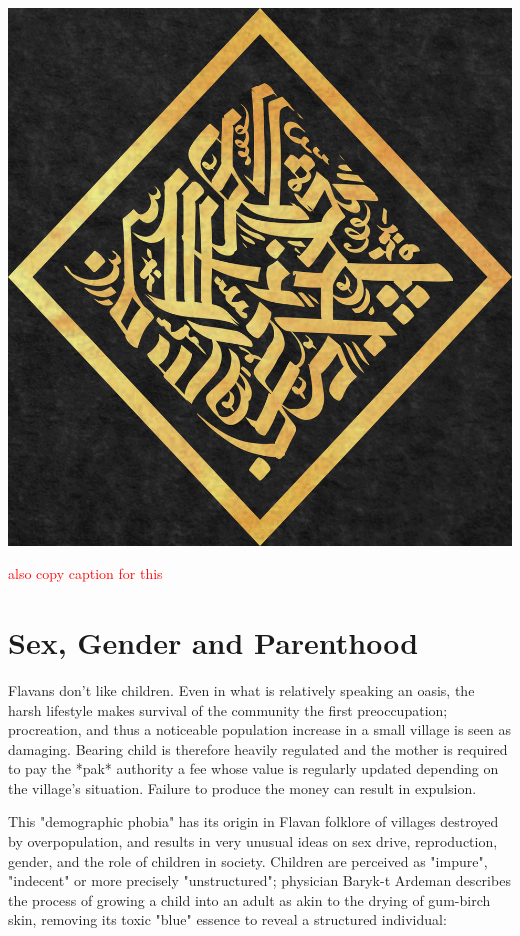 \documentclass[10pt,oneside]{memoir}
\newcommand{\cmmnt}[1]{\textcolor{red}{#1}}
\begin{document}
\includegraphics{../drawings/bigseal_gold}

\cmmnt{also copy caption for this}


\pagebreak

\section{Sex, Gender and Parenthood}

Flavans don't like children. Even in what is relatively speaking an oasis, the harsh lifestyle makes survival of the community the first preoccupation; procreation, and thus a noticeable population increase in a small village is seen as damaging. Bearing child is therefore heavily regulated and the mother is required to pay the *pak* authority a fee whose value is regularly updated depending on the village's situation. Failure to produce the money can result in expulsion.

This "demographic phobia" has its origin in Flavan folklore of villages destroyed by overpopulation, and results in very unusual ideas on sex drive, reproduction, gender, and the role of children in society. Children are perceived as "impure", "indecent" or more precisely "unstructured"; physician Baryk-t Ardeman describes the process of growing a child into an adult as akin to the drying of gum-birch skin, removing its toxic "blue" essence to reveal a structured individual:
\end{document}
